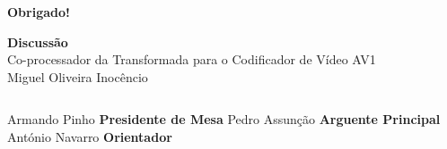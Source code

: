 \documentclass{beamer}
\begin{document}
\begin{frame}[standout, c]
       \begin{center}
              \Huge \textbf{Obrigado!}\\
       \end{center}
\end{frame}

\begin{frame}[standout,c]
       \begin{center}
              \Huge \textbf{Discussão}\\ \vspace{1cm}
              \Large Co-processador da Transformada para o Codificador de Vídeo AV1 \\ \vspace{.5cm}
              \large Miguel Oliveira Inocêncio      \\ \vspace{1.5cm}
              \begin{columns}
                            \centering
                            \large Armando Pinho
                            \small \textbf{Presidente de Mesa}
                            \centering
                            \large Pedro Assunção
                            \small \textbf{Arguente Principal}
                            \centering
                            \large António Navarro
                            \small \textbf{Orientador}
              \end{columns}
       \end{center}
\end{frame}
\end{document}
